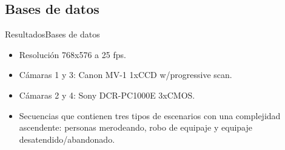 \subsection{Bases de datos}

\begin{frame}{Resultados}{Bases de datos}

\begin{itemize}
    \justifying
    \item Resolución 768x576 a 25 fps.
    \item Cámaras 1 y 3: Canon MV-1 1xCCD w/progressive scan.
    \item Cámaras 2 y 4: Sony DCR-PC1000E 3xCMOS.
    \item Secuencias que contienen tres tipos de escenarios con una complejidad ascendente: personas merodeando, robo de equipaje y equipaje desatendido/abandonado.
\end{itemize}

\vspace{0.1cm}


\end{frame}
